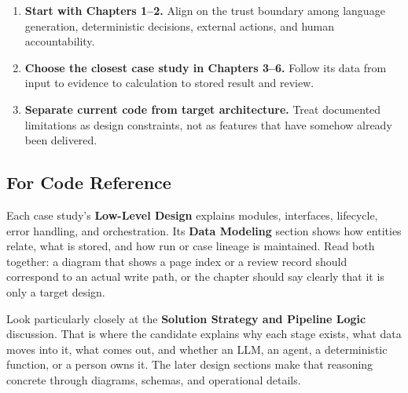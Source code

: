 \begin{enumerate}
\item \textbf{Start with Chapters 1--2.} Align on the trust boundary among language generation, deterministic decisions, external actions, and human accountability.
\item \textbf{Choose the closest case study in Chapters 3--6.} Follow its data from input to evidence to calculation to stored result and review.
\item \textbf{Separate current code from target architecture.} Treat documented limitations as design constraints, not as features that have somehow already been delivered.

\end{enumerate}
\subsection*{For Code Reference}

Each case study's \textbf{Low-Level Design} explains modules, interfaces, lifecycle, error handling, and orchestration. Its \textbf{Data Modeling} section shows how entities relate, what is stored, and how run or case lineage is maintained. Read both together: a diagram that shows a page index or a review record should correspond to an actual write path, or the chapter should say clearly that it is only a target design.

Look particularly closely at the \textbf{Solution Strategy and Pipeline Logic} discussion. That is where the candidate explains why each stage exists, what data moves into it, what comes out, and whether an LLM, an agent, a deterministic function, or a person owns it. The later design sections make that reasoning concrete through diagrams, schemas, and operational details.
